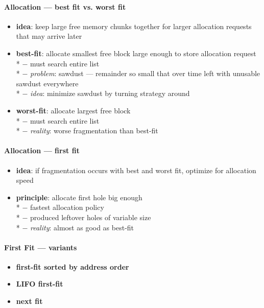 \paragraph{Allocation --- best fit vs. worst fit}
\begin{itemize}
  \item \textbf{idea}: keep large free memory chunks together for larger allocation requests that may arrive later
  \item \textbf{best-fit}: allocate smallest free block large enough to store allocation request \\*
    $ - $ must search entire list \\*
    $ - $ \emph{problem}: sawdust --- remainder so small that over time left with unusable sawdust everywhere \\*
    $ - $ \emph{idea}: minimize sawdust by turning strategy around
  \item \textbf{worst-fit}: allocate largest free block \\*
    $ - $ must search entire list \\*
    $ - $ \emph{reality}: worse fragmentation than best-fit
\end{itemize}

\paragraph{Allocation --- first fit}
\begin{itemize}
  \item \textbf{idea}: if fragmentation occurs with best and worst fit, optimize for allocation speed
  \item \textbf{principle}: allocate first hole big enough \\*
    $ - $ fastest allocation policy \\*
    $ - $ produced leftover holes of variable size \\*
    $ - $ \emph{reality}: almost as good as best-fit
\end{itemize}

\paragraph{First Fit --- variants}
\begin{itemize}
  \item \textbf{first-fit sorted by address order}
  \item \textbf{LIFO first-fit}
  \item \textbf{next fit}
\end{itemize}

